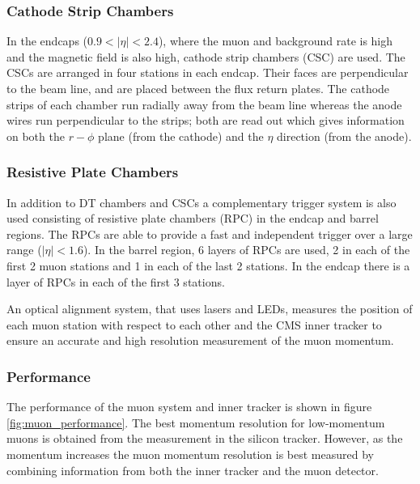 \subsubsection{Cathode Strip Chambers}
In the endcaps ($0.9<|\eta|<2.4$), where the muon and background rate is high and
the magnetic field is also high,
cathode strip chambers (CSC) are used. The
CSCs are arranged in four stations in each endcap. Their faces are perpendicular
to the beam line, and are placed between the flux return plates.  The cathode
strips of each chamber run radially away from the beam line whereas the anode
wires run perpendicular to the strips; both are read out which gives information
on both the $r-\phi$ plane (from the cathode) and the $\eta$ direction (from the
anode). \cite{cms}

\subsubsection{Resistive Plate Chambers}
In addition to DT chambers and CSCs a complementary trigger system is also used
consisting of resistive plate chambers (RPC) in the endcap and barrel regions.
The RPCs are able to provide a fast and independent trigger over a large range
($|\eta| < 1.6$). In the barrel region, 6 layers of RPCs are used, 2 in each of
the first 2 muon stations and 1 in each of the last 2 stations. In the endcap
there is a layer of RPCs in each of the first 3 stations.

An optical alignment system, that uses lasers and LEDs, measures the position
of each muon station with respect to each other and the CMS inner tracker to
ensure an accurate and high resolution measurement of the muon
momentum.\cite{cms}

\subsubsection{Performance}
The performance of the muon system and inner tracker is shown in figure
\ref{fig:muon_performance}. The best momentum resolution for low-momentum muons
is obtained from the measurement in the silicon tracker. However, as the momentum
increases the muon momentum resolution is best measured by combining information
from both the inner tracker and the muon detector.

